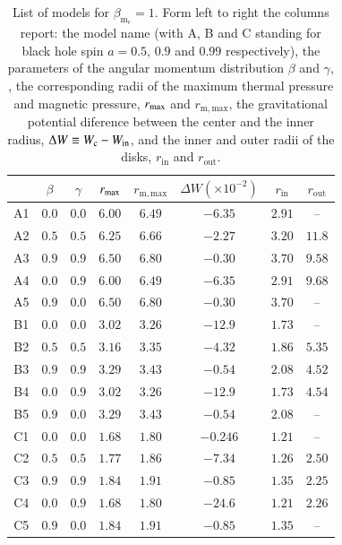 \documentclass{aa}
\begin{document}
\begin{table}
\caption{List of models for $\beta_{\mathrm{m}_{\mathrm{c}}} = 1
$. Form left to right the columns report: the model name (with A, B and C standing for black hole spin $a = 0.5$, $0.9$ and $0.99$ respectively), the parameters of the angular momentum distribution $\beta$ and $\gamma$, , the corresponding radii of the maximum thermal pressure and magnetic pressure, $r_{{\rm{max}}}$ and $r_{{\mathrm{m, max}}}$, the gravitational potential diference between the center and the inner radius, $\Delta W\equiv W_{\rm c}-W_{\rm in}$, and the inner and outer radii of the disks, $r_{\mathrm{in}}$ and $r_{\mathrm{out}}$.}             
\label{table:3}      
\centering          
\begin{tabular}{c c c c  c c c c}
\hline\hline       
 & $\beta$ & $\gamma$ & $r_{\rm{max}}$ &  $r_{\mathrm{m, max}}$ & $\Delta W (\times 10^{-2})$ & $r_{\mathrm{in}}$ & $r_{\mathrm{out}}$ \\ 
\hline           
A1 & $0.0$ & $0.0$ & $6.00$ &  $6.49$  & $-6.35$ & $2.91$ & -- \\ 
A2 & $0.5$ & $0.5$ & $6.25$ &  $6.66$  & $-2.27$ & $3.20$ & $11.8$\\ 
A3 & $0.9$ & $0.9$ & $6.50$ &  $6.80$  & $-0.30$ & $3.70$ &  $9.58$\\ 
A4 & $0.0$ & $0.9$ & $6.00$ &  $6.49$  & $-6.35$ & $2.91$ & $9.68$\\ 
A5 & $0.9$ & $0.0$ & $6.50$ &  $6.80$  & $-0.30$ & $3.70$ & --\\ 
 \hline 
B1 & $0.0$ & $0.0$ & $3.02$ &  $3.26$  & $-12.9$ & $1.73$ & -- \\ 
B2 & $0.5$ & $0.5$ & $3.16$ &  $3.35$  & $-4.32$ & $1.86$ & $5.35$\\
B3 & $0.9$ & $0.9$ & $3.29$ &  $3.43$  & $-0.54$ & $2.08$ & $4.52$\\ 
B4 & $0.0$ & $0.9$ & $3.02$ &  $3.26$  & $-12.9$ & $1.73$ & $4.54$\\  
B5 & $0.9$ & $0.0$ & $3.29$ &  $3.43$  & $-0.54$ & $2.08$ & -- \\ 
 \hline 
C1 & $0.0$ & $0.0$ & $1.68$ &  $1.80$  & $-0.246$ & $1.21$ & -- \\ 
C2 & $0.5$ & $0.5$ & $1.77$ &  $1.86$  & $-7.34$ & $1.26$ & $2.50$\\  
C3 & $0.9$ & $0.9$ & $1.84$ &  $1.91$  & $-0.85$ & $1.35$ & $2.25$\\ 
C4 & $0.0$ & $0.9$ & $1.68$ &  $1.80$  & $-24.6$ & $1.21$ & $2.26$\\ 
C5 & $0.9$ & $0.0$ & $1.84$ &  $1.91$  & $-0.85$ & $1.35$ & --\\ 
\hline      
\end{tabular}
\end{table}
\end{document}
